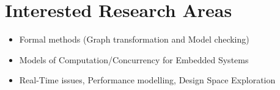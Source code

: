 \section{Interested Research Areas}
\begin{itemize}

\item Formal methods (Graph transformation and Model checking)

\item Models of Computation/Concurrency for Embedded Systems

\item Real-Time issues, Performance modelling, Design Space
Exploration

\end{itemize}
